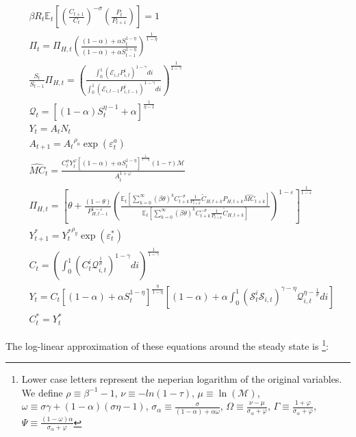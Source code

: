 \documentclass{article}
\newcommand{\Et}{\mathbb{E}_t}
\newcommand{\E}{\mathcal{E}}
\begin{document}
\begin{subequations}
    \label{se}
    \begin{align}
        &\beta R_t \Et\left[\left(\frac{C_{t+1}}{C_t} \right)^{-\sigma} \left(\frac{P_t}{P_{t+1}} \right) \right] = 1\\
        &\Pi_t = \Pi_{H,t} \left(\frac{(1-\alpha) + \alpha S_t^{1-\eta}} {(1-\alpha) + \alpha S_{t-1}^{1-\eta}} \right)^{\frac{1}{1-\eta}}\\
        &\frac{S_t}{S_{t-1}}\Pi_{H,t} = \left(\frac{\int^1_0 \left(\E_{i,t} P^i_{i,t} \right)^{1-\gamma} di }{\int^1_0 \left(\E_{i,t-1} P^i_{i,t-1} \right)^{1-\gamma} di} \right)^{\frac{1}{1-\gamma}}\\
        &\mathcal{Q}_{t}  = \left[(1-\alpha)S_t^{\eta-1} + \alpha \right]^{\frac{1}{\eta-1}}\\
        &Y_t = A_t N_t\\
        &A_{t+1} = {A_t}^{\rho_a}\exp( \varepsilon^a_t)\\
        &\widehat{MC}_t  = \frac{C_t^\sigma Y_t^\varphi \left[(1-\alpha) + \alpha S_t^{1-\eta} \right]^{\frac{1}{1-\eta}} (1 - \tau) \mathcal M}{A_t^{1+\varphi}}\\
        &\Pi_{H,t} = \left[ \theta + \frac{(1-\theta)}{P_{H,t-1}^{1-\varepsilon}} \left(\frac{\Et\left[ \sum^\infty_{k=0} (\beta\theta)^k C_{t+k}^{-\sigma} \frac{1}{P_{t+k}}\tilde C_{H,t+k} P_{H,t+k} \widehat{MC}_{t+k}\right] }{\Et\left[ \sum^\infty_{k=0} (\beta\theta)^k C_{t+k}^{-\sigma} \frac{1}{P_{t+k}} \tilde C_{H,t+k}  \right]} \right)^{1-\varepsilon}\right]^\frac{1}{1-\varepsilon}\\
        &Y^*_{t+1} = {Y^*_t}^{\rho_y}\exp( \varepsilon^*_t)\\
        &C_t = \left(\int^1_0  \left(C_t^i \mathcal Q_{i,t}^{\frac{1}{\sigma}}\right)^{1-\gamma} di \right)^{\frac{1}{1-\gamma}}\\
        &Y_{t} = C_t \left[(1-\alpha) + \alpha S_t^{1-\eta} \right]^{\frac{\eta}{1-\eta}} \left[(1-\alpha)  +  \alpha \int_0^1 \left(\mathcal S^i_t \mathcal S_{i,t} \right)^{\gamma - \eta} \mathcal Q^{\eta - \frac{1}{\sigma}}_{i,t} di \right] \\
        & C_t^* = Y_t^*
    \end{align}
\end{subequations}

The log-linear approximation of these equations around the steady state is \footnote{Lower case letters represent the neperian logarithm of the original variables. We define $\rho \equiv \beta^{-1} -1$,  $\nu \equiv -ln(1-\tau)$, $\mu \equiv \ln(\mathcal M)$, $\omega \equiv \sigma \gamma + (1-\alpha)(\sigma \eta - 1)$, $\sigma_\alpha \equiv \frac{\sigma}{(1-\alpha) + \alpha \omega}$, $\Omega \equiv \frac{\nu - \mu}{\sigma_\alpha + \varphi}$, $\Gamma \equiv \frac{1 + \varphi}{\sigma_\alpha + \varphi}$, $\Psi \equiv \frac{(1-\omega) \alpha}{\sigma_\alpha + \varphi}$}:
\end{document}
